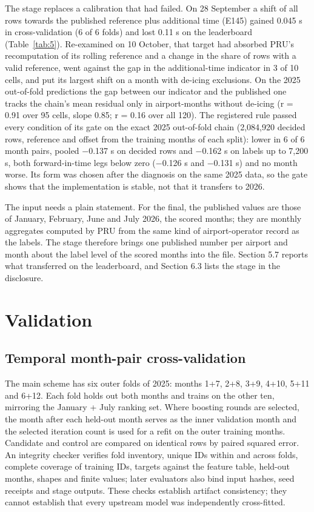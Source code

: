 \documentclass[11pt,a4paper]{article}
\begin{document}
The stage replaces a calibration that had failed. On 28 September a shift of all rows towards the published reference plus additional time (E145) gained 0.045 s in cross-validation (6 of 6 folds) and lost 0.11 s on the leaderboard (Table~\ref{tab:5}). Re-examined on 10 October, that target had absorbed PRU's recomputation of its rolling reference and a change in the share of rows with a valid reference, went against the gap in the additional-time indicator in 3 of 10 cells, and put its largest shift on a month with de-icing exclusions. On the 2025 out-of-fold predictions the gap between our indicator and the published one tracks the chain's mean residual only in airport-months without de-icing (r = 0.91 over 95 cells, slope 0.85; r = 0.16 over all 120). The registered rule passed every condition of its gate on the exact 2025 out-of-fold chain (2,084,920 decided rows, reference and offset from the training months of each split): lower in 6 of 6 month pairs, pooled $-$0.137 s on decided rows and $-$0.162 s on labels up to 7,200 s, both forward-in-time legs below zero ($-$0.126 s and $-$0.131 s) and no month worse. Its form was chosen after the diagnosis on the same 2025 data, so the gate shows that the implementation is stable, not that it transfers to 2026.

The input needs a plain statement. For the final, the published values are those of January, February, June and July 2026, the scored months; they are monthly aggregates computed by PRU from the same kind of airport-operator record as the labels. The stage therefore brings one published number per airport and month about the label level of the scored months into the file. Section 5.7 reports what transferred on the leaderboard, and Section 6.3 lists the stage in the disclosure.

\section{Validation}\label{validation}

\subsection{Temporal month-pair cross-validation}\label{temporal-month-pair-cross-validation}

The main scheme has six outer folds of 2025: months 1+7, 2+8, 3+9, 4+10, 5+11 and 6+12. Each fold holds out both months and trains on the other ten, mirroring the January + July ranking set. Where boosting rounds are selected, the month after each held-out month serves as the inner validation month and the selected iteration count is used for a refit on the outer training months. Candidate and control are compared on identical rows by paired squared error. An integrity checker verifies fold inventory, unique IDs within and across folds, complete coverage of training IDs, targets against the feature table, held-out months, shapes and finite values; later evaluators also bind input hashes, seed receipts and stage outputs. These checks establish artifact consistency; they cannot establish that every upstream model was independently cross-fitted.
\end{document}
